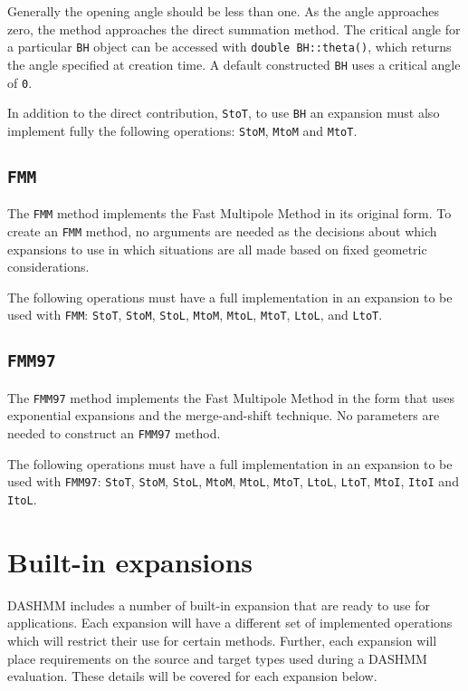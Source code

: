 \noindent Generally the opening angle should be less than one. As the
angle approaches
zero, the method approaches the direct summation method. The critical angle
for a particular \texttt{BH} object can be accessed with
\texttt{double BH::theta()}, which returns the angle specified at creation
time. A default constructed \texttt{BH} uses a critical angle of \texttt{0}.

In addition to the direct contribution, \texttt{StoT}, to use \texttt{BH} an
expansion must also implement fully the following operations: \texttt{StoM},
\texttt{MtoM} and \texttt{MtoT}.

\subsection{\texttt{FMM}}

The \texttt{FMM} method implements the Fast Multipole Method in its original form.
To create an \texttt{FMM} method, no arguments are needed as the decisions about
which expansions to use in which situations are all made based on fixed
geometric considerations.

The following operations must have a full implementation in an expansion to be
used with \texttt{FMM}: \texttt{StoT}, \texttt{StoM}, \texttt{StoL},
\texttt{MtoM}, \texttt{MtoL}, \texttt{MtoT}, \texttt{LtoL}, and \texttt{LtoT}.

\subsection{\texttt{FMM97}}

The \texttt{FMM97} method implements the Fast Multipole Method in the form that
uses exponential expansions and the merge-and-shift technique. No parameters
are needed to construct an \texttt{FMM97} method.

The following operations must have a full implementation in an expansion to be
used with \texttt{FMM97}: \texttt{StoT}, \texttt{StoM}, \texttt{StoL},
\texttt{MtoM}, \texttt{MtoL}, \texttt{MtoT}, \texttt{LtoL},
\texttt{LtoT}, \texttt{MtoI}, \texttt{ItoI} and \texttt{ItoL}.


\section{Built-in expansions}
\label{sec:bi-exp}

DASHMM includes a number of built-in expansion that are ready to use for
applications. Each expansion will have a different set of implemented
operations which will restrict their use for certain methods. Further, each
expansion will place requirements on the source and target types used during
a DASHMM evaluation. These details will be covered for each expansion
below.


